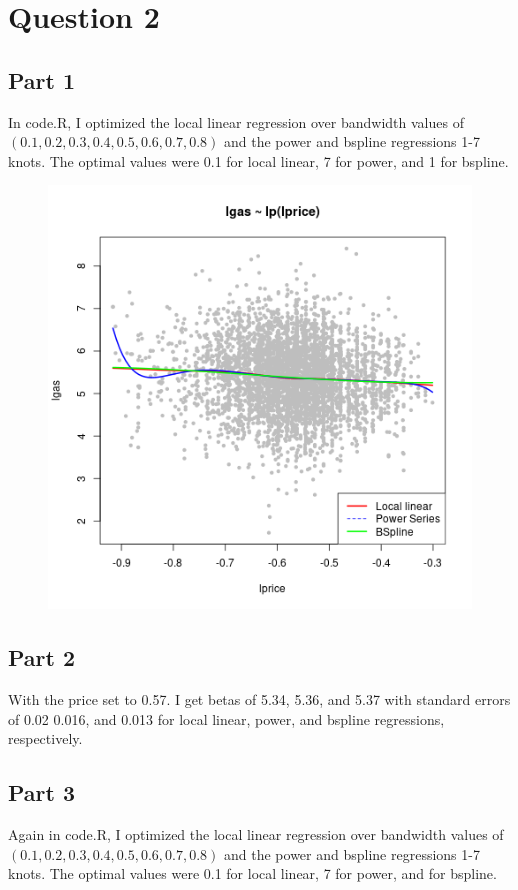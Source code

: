 \documentclass{article}
\begin{document}
\section{Question 2}

\subsection{Part 1}
In code.R, I optimized the local linear regression over bandwidth values of $(0.1,0.2,0.3,0.4,0.5,0.6,0.7,0.8)$ and the power and bspline regressions 1-7 knots. The optimal values were 0.1 for local linear, 7 for power, and 1 for bspline.
\begin{figure}
	\centering
	\includegraphics{Q2_1.png}
\end{figure}
\subsection{Part 2}
With the price set to 0.57. I get betas of 5.34, 5.36, and 5.37 with standard errors of 0.02 0.016, and 0.013 for local linear, power, and bspline regressions, respectively.
\subsection{Part 3}
Again in code.R, I optimized the local linear regression over bandwidth values of $(0.1,0.2,0.3,0.4,0.5,0.6,0.7,0.8)$ and the power and bspline regressions 1-7 knots. The optimal values were 0.1 for local linear, 7 for power, and for bspline.
\end{document}
